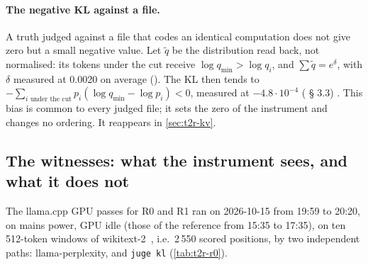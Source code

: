 \paragraph{The negative KL against a file.} A truth judged against a file that codes an identical computation does not give zero but a small negative value. Let $\tilde q$ be the distribution read back, not normalised: its tokens under the cut receive $\log q_{\min} > \log q_i$, and $\sum\tilde q = e^{\delta}$, with $\delta$ measured at 0.0020 on average (). The KL then tends to $-\sum_{i \text{ under the cut}} p_i(\log q_{\min} - \log p_i) < 0$, measured at $-4.8\cdot10^{-4}$ ( § 3.3) \mes. This bias is common to every judged file; it sets the zero of the instrument and changes no ordering. It reappears in \cref{sec:t2r-kv}.

\subsection{The witnesses: what the instrument sees, and what it does not}\label{sec:t2r-temoins}

The llama.cpp GPU passes for R0 and R1 ran on 2026-10-15 from 19:59 to 20:20, on mains power, GPU idle (those of the reference from 15:35 to 17:35), on ten 512-token windows of wikitext-2~\cite{merity2016wikitext}, i.e.\ 2\,550 scored positions, by two independent paths: llama-perplexity, and \texttt{juge kl} (\cref{tab:t2r-r0}).

